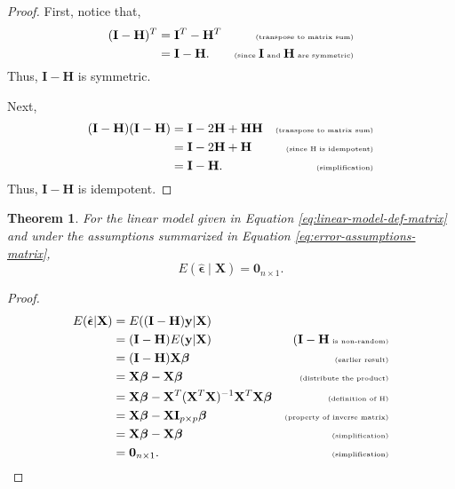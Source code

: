 \documentclass[
]{book}
\newtheorem{theorem}{Theorem}[chapter]
\theoremstyle{definition}
\theoremstyle{definition}
\theoremstyle{definition}
\theoremstyle{definition}
\theoremstyle{remark}
\begin{document}
\begin{proof}
First, notice that,
\[
\begin{aligned}
(\mathbf{I}-\mathbf{H})^T &= \mathbf{I}^T-\mathbf{H}^T&\tiny\text{(transpose to matrix sum)}\\
&= \mathbf{I}-\mathbf{H}.&\tiny\text{(since }\mathbf{I}\text{ and }\mathbf{H}\text{ are symmetric)}
\end{aligned}
\]
Thus, \(\mathbf{I}-\mathbf{H}\) is symmetric.

Next,
\[
\begin{aligned}
(\mathbf{I}-\mathbf{H})(\mathbf{I}-\mathbf{H})&=\mathbf{I}-2\mathbf{H}+\mathbf{H}\mathbf{H}&\tiny\text{(transpose to matrix sum)}\\
&=\mathbf{I}-2\mathbf{H}+\mathbf{H}&\tiny\text{(since H is idempotent)}\\
&=\mathbf{I}-\mathbf{H}.&\tiny\text{(simplification)}
\end{aligned}
\]
Thus, \(\mathbf{I}-\mathbf{H}\) is idempotent.
\end{proof}

\begin{theorem}
\protect\hypertarget{thm:mean-residuals}{}\label{thm:mean-residuals}For the linear model given in Equation \eqref{eq:linear-model-def-matrix} and under the assumptions summarized in Equation \eqref{eq:error-assumptions-matrix},
\[
E(\hat{\boldsymbol{\epsilon}}\mid \mathbf{X})=\mathbf{0}_{n\times 1}.\label{eq:mean-residuals}
\]
\end{theorem}

\begin{proof}
\[
\begin{aligned}
E(\hat{\boldsymbol{\epsilon}}|\mathbf{X})&=E((\mathbf{I}-\mathbf{H})\mathbf{y}|\mathbf{X})\\
&=(\mathbf{I}-\mathbf{H})E(\mathbf{y}|\mathbf{X})&\tiny(\mathbf{I}-\mathbf{H}\text{ is non-random)}\\
&=(\mathbf{I}-\mathbf{H})\mathbf{X}\boldsymbol\beta&\tiny\text{(earlier result)}\\
&=\mathbf{X}\boldsymbol\beta-\mathbf{X}\boldsymbol\beta&\tiny\text{(distribute the product)}\\
&=\mathbf{X}\boldsymbol\beta-\mathbf{X}^T(\mathbf{X}^T\mathbf{X})^{-1}\mathbf{X}^T\mathbf{X}\boldsymbol\beta&\tiny\text{(definition of H)}\\
&=\mathbf{X}\boldsymbol\beta-\mathbf{X}\mathbf{I}_{p\times p}\boldsymbol\beta&\tiny\text{(property of inverse matrix)}\\
&=\mathbf{X}\boldsymbol\beta-\mathbf{X}\boldsymbol\beta&\tiny\text{(simplification)}\\
&=\mathbf{0}_{n\times1}.&\tiny\text{(simplification)}
\end{aligned}
\]
\end{proof}
\end{document}
